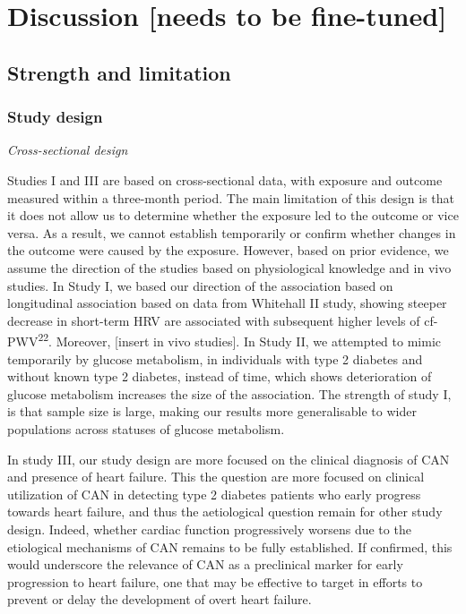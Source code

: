 \documentclass[
  a4paper,
  headsepline=true,
  open=any]{scrbook}
\begin{document}

\hypertarget{discussion-needs-to-be-fine-tuned}{%
\chapter{Discussion {[}needs to be
fine-tuned{]}}\label{discussion-needs-to-be-fine-tuned}}

\hypertarget{strength-and-limitation}{%
\section{Strength and limitation}\label{strength-and-limitation}}

\hypertarget{study-design}{%
\subsection{Study design}\label{study-design}}

\emph{Cross-sectional design}

Studies I and III are based on cross-sectional data, with exposure and
outcome measured within a three-month period. The main limitation of
this design is that it does not allow us to determine whether the
exposure led to the outcome or vice versa. As a result, we cannot
establish temporarily or confirm whether changes in the outcome were
caused by the exposure. However, based on prior evidence, we assume the
direction of the studies based on physiological knowledge and in vivo
studies. In Study I, we based our direction of the association based on
longitudinal association based on data from Whitehall II study, showing
steeper decrease in short-term HRV are associated with subsequent higher
levels of cf-PWV\textsuperscript{22}. Moreover, {[}insert in vivo
studies{]}. In Study II, we attempted to mimic temporarily by glucose
metabolism, in individuals with type 2 diabetes and without known type 2
diabetes, instead of time, which shows deterioration of glucose
metabolism increases the size of the association. The strength of study
I, is that sample size is large, making our results more generalisable
to wider populations across statuses of glucose metabolism.

In study III, our study design are more focused on the clinical
diagnosis of CAN and presence of heart failure. This the question are
more focused on clinical utilization of CAN in detecting type 2 diabetes
patients who early progress towards heart failure, and thus the
aetiological question remain for other study design. Indeed, whether
cardiac function progressively worsens due to the etiological mechanisms
of CAN remains to be fully established. If confirmed, this would
underscore the relevance of CAN as a preclinical marker for early
progression to heart failure, one that may be effective to target in
efforts to prevent or delay the development of overt heart failure.
\end{document}
